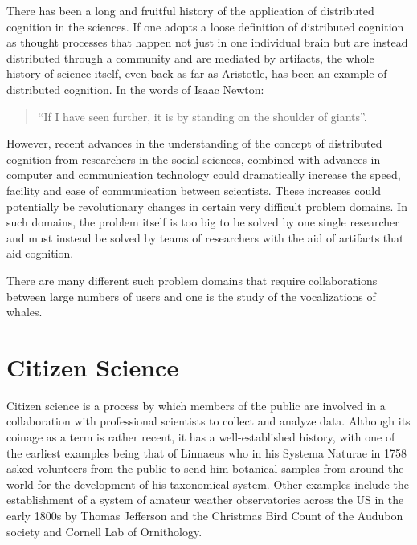 \documentclass[12pt,oneside]{book}
\begin{document}
There has been a long and fruitful history of the application of
distributed cognition in the sciences.  If one adopts a loose
definition of distributed cognition as thought processes that happen
not just in one individual brain but are instead distributed through
a community and are mediated by artifacts, the whole history of
science itself, even back as far as Aristotle, has been an example of
distributed cognition.  In the words of Isaac Newton:

\begin{quote}
 ``If I have seen further, it is by standing on the shoulder of
  giants''.
\end{quote}

However, recent advances in the understanding of the concept of
distributed cognition from researchers in the social sciences,
combined with advances in computer and communication technology could
dramatically increase the speed, facility and ease of communication
between scientists.  These increases could potentially be
revolutionary changes in certain very difficult problem domains.  In
such domains, the problem itself is too big to be solved by one single
researcher and must instead be solved by teams of researchers with the
aid of artifacts that aid cognition.

There are many different such problem domains that require
collaborations between large numbers of users and one is the study of
the vocalizations of whales.

\section{Citizen Science}
\label{section:relatedWork:citizenScience}

Citizen science is a process by which members of the public are
involved in a collaboration with professional scientists to collect
and analyze data.  Although its coinage as a term is rather recent, it
has a well-established history, with one of the earliest examples
being that of Linnaeus who in his Systema Naturae
\cite{linnaeus1758systema} in 1758 asked volunteers from the public to
send him botanical samples from around the world for the development
of his taxonomical system.  Other examples include the establishment
of a system of amateur weather observatories across the US in the
early 1800s by Thomas Jefferson \cite{fiebrich2009history} and the
Christmas Bird Count \cite{lebaron2009bird} of the Audubon society and
Cornell Lab of Ornithology.
\end{document}
